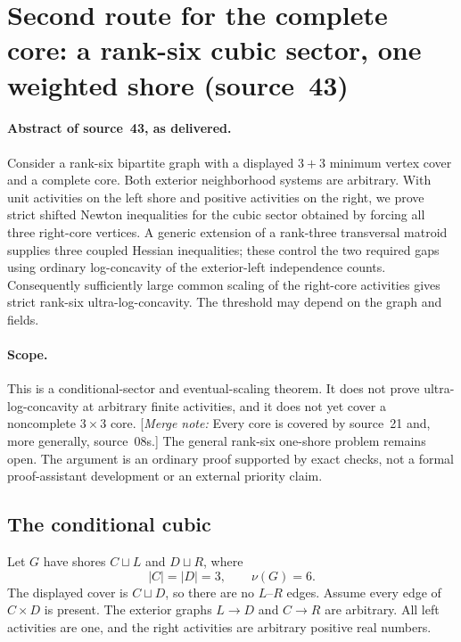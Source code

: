 \documentclass[11pt,a4paper]{article}
\theoremstyle{remark}\newtheorem{remark}[theorem]{Remark}
\newcommand{\mnote}[1]{[\textit{Merge note:} #1]}
\begin{document}
\section{Second route for the complete core: a rank-six cubic sector, one weighted shore (source~43)}\label{mrn:src:43}
\paragraph{Abstract of source~43, as delivered.} Consider a rank-six bipartite graph with a displayed $3+3$ minimum vertex cover and a complete core. Both exterior neighborhood systems are arbitrary. With unit activities on the left shore and positive activities on the right, we prove strict shifted Newton inequalities for the cubic sector obtained by forcing all three right-core vertices. A generic extension of a rank-three transversal matroid supplies three coupled Hessian inequalities; these control the two required gaps using ordinary log-concavity of the exterior-left independence counts. Consequently sufficiently large common scaling of the right-core activities gives strict rank-six ultra-log-concavity. The threshold may depend on the graph and fields.

\paragraph{Scope.}
This is a conditional-sector and eventual-scaling theorem. It does not prove ultra-log-concavity at arbitrary finite activities, and it does not yet cover a noncomplete $3\times3$ core. \mnote{Every core is covered by source~21 and, more generally, source~08s.} The general rank-six one-shore problem remains open. The argument is an ordinary proof supported by exact checks, not a formal proof-assistant development or an external priority claim.

\subsection{The conditional cubic}
Let $G$ have shores $C\sqcup L$ and $D\sqcup R$, where
\[
 |C|=|D|=3,\qquad \nu(G)=6.
\]
The displayed cover is $C\sqcup D$, so there are no $L$--$R$ edges. Assume every edge of $C\times D$ is present. The exterior graphs $L\to D$ and $C\to R$ are arbitrary. All left activities are one, and the right activities are arbitrary positive real numbers.
\end{document}

